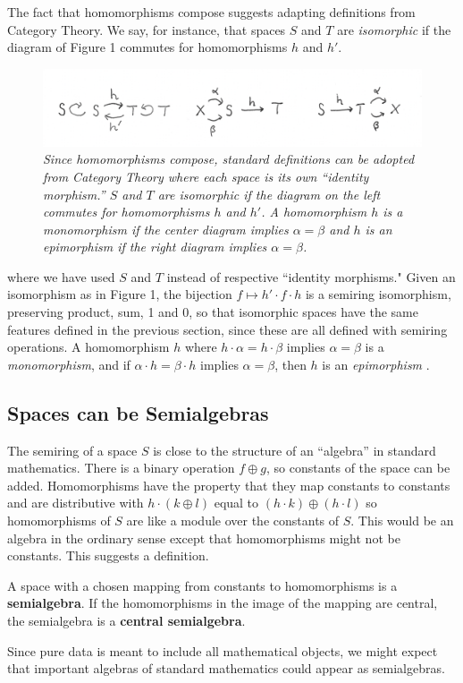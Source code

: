\documentclass[11pt]{article}
\begin{document}
The fact that homomorphisms compose suggests adapting definitions from Category Theory.  
We say, for instance, that spaces $S$ and $T$ are {\it isomorphic} if the diagram of Figure 1 commutes for homomorphisms 
$h$ and $h'$.  
\begin{figure}[h]
\centering
\includegraphics[width=1.0\textwidth]{isomorphism.png}
\caption{{\it Since homomorphisms compose, standard definitions can be adopted from Category Theory where each space is its own ``identity morphism.'' 
$S$ and $T$ are isomorphic if the diagram on the left commutes for homomorphisms $h$ and $h'$.  A homomorphism $h$ is a monomorphism if the center 
diagram implies $\alpha=\beta$ and $h$ is an epimorphism if the right diagram implies $\alpha=\beta$.}}  
\end{figure}
where we have used $S$ and $T$ instead of respective ``identity morphisms."  Given an isomorphism as in Figure 1, the bijection $f\mapsto h'\cdot f \cdot h$ is 
a semiring isomorphism, preserving product, sum, 1 and 0, so that isomorphic spaces have the same features defined in the previous section, since 
these are all defined with semiring operations.  A homomorphism $h$ where $h\cdot \alpha=h\cdot \beta$ implies $\alpha=\beta$ is a {\it monomorphism}, and if $\alpha\cdot h=\beta\cdot h$ implies $\alpha=\beta$, then $h$ is an {\it epimorphism} \cite{categories}.  

\subsection{Spaces can be Semialgebras} 

The semiring of a space $S$ is close to the structure of an ``algebra'' in standard mathematics.  There is a binary operation $f\oplus g$, so 
constants of the space can be added.  Homomorphisms have the property that they map constants to constants and are distributive with 
$h\cdot (k\oplus l)$ equal to $(h\cdot k)\oplus (h\cdot l)$ so homomorphisms of $S$ are like a module over the constants of $S$.  This would 
be an algebra in the ordinary sense except that homomorphisms might not be constants.  This suggests a definition. 

\begin{definition}
A space with a chosen mapping from constants to homomorphisms is a {\bf semialgebra}.  If the homomorphisms 
in the image of the mapping are central, the semialgebra is a {\bf central semialgebra}.  
\end{definition}
\noindent Since pure data is meant to include all mathematical objects, we might expect that important algebras of standard 
mathematics could appear as semialgebras. 
\end{document}
